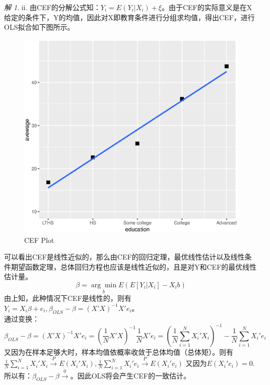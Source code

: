 \documentclass[a4paper]{ctexart}
\theoremstyle{remark}
\newtheorem*{solution}{解}
\begin{document}
\begin{itemize}
\begin{solution}
    ii. 由CEF的分解公式知：$Y_i = E(Y_i|X_i)+\xi$。由于CEF的实际意义是在X给定的条件下，Y的均值，因此对X即教育条件进行分组求均值，得出CEF，进行OLS拟合如下图所示。
    \begin{figure}[htbp] %
        \centering
        \includegraphics[scale=0.5]{R CEF.eps}
        \caption{CEF Plot}
    \end{figure}
    可以看出CEF是线性近似的，那么由CEF的回归定理，最优线性估计以及线性条件期望函数定理，总体回归方程也应该是线性近似的，且是对Y和CEF的最优线性估计量。
        \begin{equation*}
            \beta = \underset{b}{\arg \min}E{(E[Y_i|X_i] - X_i b)}
        \end{equation*}
    由上知，此种情况下CEF是线性的，则有$Y_i = X_i \beta+e_i,\beta_{OLS} -\beta =(X'X)^{-1}X'e_i$。\\
    通过变换：
    \begin{equation*}
        \beta_{OLS} -\beta =(X'X)^{-1}X'e_i=(\frac{1}{N}X'X)^{-1}\frac{1}{N}X'e_i=
        (\frac{1}{N}\sum_{i=1}^{N} X_i'X_i)^{-1}-\frac{1}{N}\sum_{i=1}^{N}X_i'e_i 
    \end{equation*}
    又因为在样本足够大时，样本均值依概率收敛于总体均值（总体矩）。则有\\
    $\frac{1}{N}\sum_{i=1}^{N} X_i'X_i\xrightarrow{P}E(X_i'X_i),\frac{1}{N}\sum_{i=1}^{N}X_i'e_i\xrightarrow{P}E(X_i'e_i)$
    又因为$E(X_i'e_i)=0$.所以有：$\beta_{OLS} -\beta\xrightarrow0$。因此OLS将会产生CEF的一致估计。


\end{solution}
\end{itemize}
\end{document}
